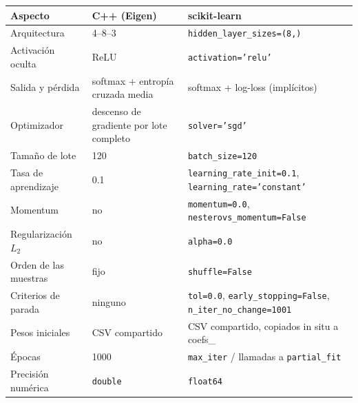 \begin{tabular}{lp{4.1cm}p{5.6cm}}
\toprule
Aspecto & C++ (Eigen) & scikit-learn \\
\midrule
Arquitectura & 4--8--3 & \texttt{hidden\_layer\_sizes=(8,)} \\
Activación oculta & ReLU & \texttt{activation='relu'} \\
Salida y pérdida & softmax + entropía cruzada media & softmax + log-loss (implícitos) \\
Optimizador & descenso de gradiente por lote completo & \texttt{solver='sgd'} \\
Tamaño de lote & 120 & \texttt{batch\_size=120} \\
Tasa de aprendizaje & 0.1 & \texttt{learning\_rate\_init=0.1}, \texttt{learning\_rate='constant'} \\
Momentum & no & \texttt{momentum=0.0}, \texttt{nesterovs\_momentum=False} \\
Regularización $L_2$ & no & \texttt{alpha=0.0} \\
Orden de las muestras & fijo & \texttt{shuffle=False} \\
Criterios de parada & ninguno & \texttt{tol=0.0}, \texttt{early\_stopping=False}, \texttt{n\_iter\_no\_change=1001} \\
Pesos iniciales & CSV compartido & CSV compartido, copiados in situ a coefs\_ \\
Épocas & 1000 & \texttt{max\_iter} / llamadas a \texttt{partial\_fit} \\
Precisión numérica & \texttt{double} & \texttt{float64} \\
\bottomrule
\end{tabular}
